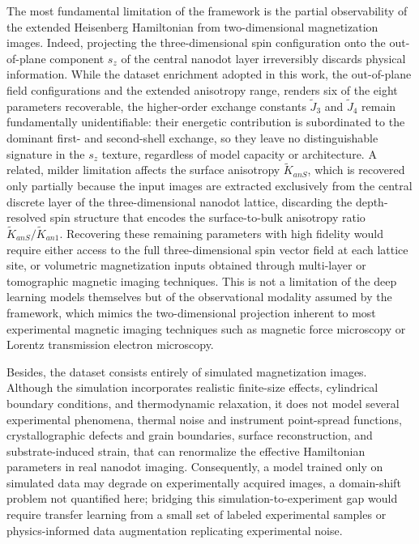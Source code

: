 \documentclass[final,5p,times,twocolumn]{elsarticle}
\begin{document}
The most fundamental limitation of the framework is the partial observability of the extended Heisenberg Hamiltonian from
two-dimensional magnetization images. Indeed, projecting the
three-dimensional spin configuration onto the out-of-plane component
$s_z$ of the central nanodot layer irreversibly discards physical
information. While the dataset enrichment adopted in this work, the
out-of-plane field configurations and the extended anisotropy
range, renders six of the eight parameters recoverable, the
higher-order exchange constants $\tilde{J}_3$ and $\tilde{J}_4$ remain
fundamentally unidentifiable: their energetic contribution is
subordinated to the dominant first- and second-shell exchange, so
they leave no distinguishable signature in the $s_z$ texture,
regardless of model capacity or architecture. A related, milder
limitation affects the surface anisotropy $\tilde{K}_{anS}$, which is
recovered only partially because the input images are extracted
exclusively from the central discrete layer of the three-dimensional nanodot
lattice, discarding the depth-resolved spin structure that encodes
the surface-to-bulk anisotropy ratio
$\tilde{K}_{anS}/\tilde{K}_{an1}$. Recovering these remaining
parameters with high fidelity would require either access to the full
three-dimensional spin vector field at each lattice site, or volumetric magnetization inputs obtained
through multi-layer or tomographic magnetic imaging techniques. This
is not a limitation of the deep learning models themselves but of
the observational modality assumed by the framework, which mimics
the two-dimensional projection inherent to most experimental
magnetic imaging techniques such as magnetic force microscopy or
Lorentz transmission electron microscopy.

Besides, the dataset consists entirely of simulated magnetization images. Although the simulation
incorporates realistic finite-size effects, cylindrical boundary
conditions, and thermodynamic relaxation, it does not model several
experimental phenomena, thermal noise and instrument point-spread
functions, crystallographic defects and grain boundaries, surface
reconstruction, and substrate-induced strain, that can renormalize
the effective Hamiltonian parameters in real nanodot imaging.
Consequently, a model trained only on simulated data may degrade on
experimentally acquired images, a domain-shift problem not quantified
here; bridging this simulation-to-experiment gap would require
transfer learning from a small set of labeled experimental samples or
physics-informed data augmentation replicating experimental noise.
\end{document}
